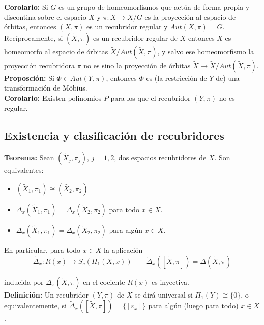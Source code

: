 \documentclass{article}
\begin{document}
\textbf{Corolario:} Si $G$ es un grupo de homeomorfismos que actúa de forma propia y discontina sobre el espacio $X$ y $\pi:X\rightarrow X/G$ es la proyección al espacio de órbitas, entonces $(X,\pi)$ es un recubridor regular y $Aut(X,\pi)=G$. \\

Recíprocamente, si $(\tilde{X},\pi)$ es un recubridor regular de $X$ entonces $X$ es homeomorfo al espacio de órbitas $\tilde{X}/Aut(\tilde{X},\pi)$, y salvo ese homeomorfismo la proyección recubridora $\pi$ no es sino la proyección de órbitas $\tilde{X}\rightarrow \tilde{X}/Aut(\tilde{X},\pi)$.\\

\textbf{Proposción:} Si $\Phi\in Aut(Y,\pi)$, entonces $\Phi$ es (la restricción de $Y$ de) una transformación de Möbius.\\

\textbf{Corolario:} Existen polinomios $P$ para los que el recubridor $(Y,\pi)$ no es regular.

\subsection{Existencia y clasificación de recubridores}
\textbf{Teorema:} Sean $(\tilde{X}_j,\pi_j)$, $j=1,2$, dos espacios recubridores de $X$. Son equivalentes:
\begin{itemize}
\item $(\tilde{X}_1,\pi_1)\cong(\tilde{X_2},\pi_2)$

\item $\Delta_x(\tilde{X}_1,\pi_1)=\Delta_x(\tilde{X}_2,\pi_2)$ para todo $x\in X$.

\item $\Delta_x(\tilde{X}_1,\pi_1)=\Delta_x(\tilde{X}_2,\pi_2)$ para algún $x\in X$.
\end{itemize}

En particular, para todo $x\in X$ la aplicación
\begin{equation*}
\tilde{\Delta}_x:R(x)\rightarrow S_c(\Pi_1(X,x))\qquad \tilde{\Delta}_x([\tilde{X},\pi])=\Delta(\tilde{X},\pi)
\end{equation*}

inducida por $\Delta_x(\tilde{X},\pi)$ en el cociente $R(x)$ es inyectiva. \\

\textbf{Definición:} Un recubridor $(Y,\pi)$ de $X$ se dirá universal si $\Pi_1(Y)\cong\{0\}$, o equivalentemente, si $\tilde{\Delta}_x([\tilde{X},\pi])=\{[\varepsilon_x]\}$ para algún (luego para todo) $x\in X$.\\
\end{document}
